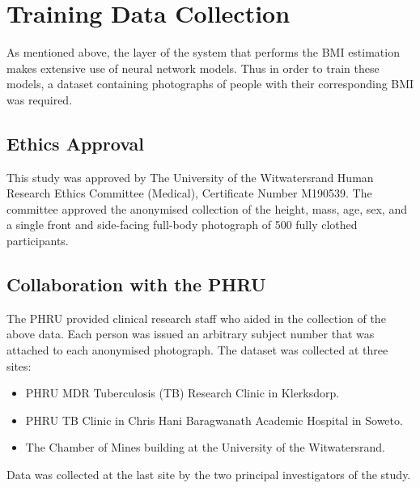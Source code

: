 \documentclass[conference]{IEEEtran}
\begin{document}
\section{Training Data Collection}
As mentioned above, the layer of the system that performs the BMI estimation makes extensive use of neural network models.
Thus in order to train these models, a dataset containing photographs of people with their corresponding BMI was required.
\subsection{Ethics Approval}
This study was approved by The University of the Witwatersrand Human Research Ethics Committee (Medical), Certificate Number M190539.
The committee approved the anonymised collection of the height, mass, age, sex, and a single front and side-facing full-body photograph of 500 fully clothed participants.
\subsection{Collaboration with the PHRU}
The PHRU provided clinical research staff who aided in the collection of the above data.
Each person was issued an arbitrary subject number that was attached to each anonymised photograph.
The dataset was collected at three sites:
\begin{itemize}
	\item PHRU MDR Tuberculosis (TB) Research Clinic in Klerksdorp.
	\item PHRU TB Clinic in Chris Hani Baragwanath Academic Hospital in Soweto.
	\item The Chamber of Mines building at the University of the Witwatersrand.
\end{itemize}
Data was collected at the last site by the two principal investigators of the study.
\end{document}
